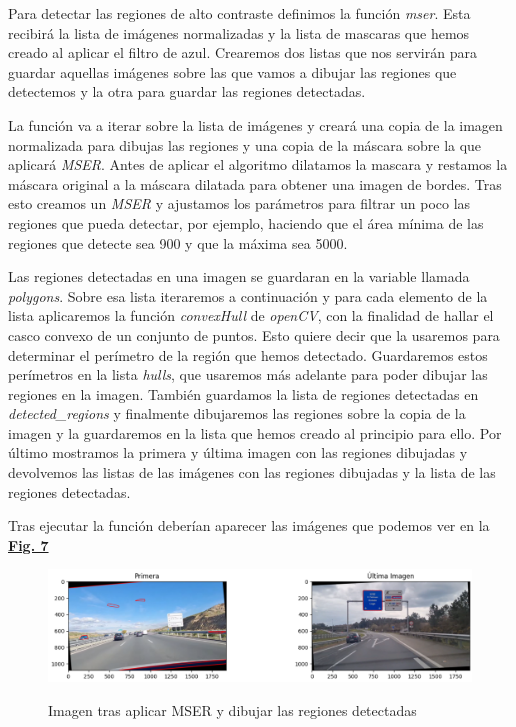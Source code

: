 \documentclass[a4paper, 12pt]{article}
\begin{document}
Para detectar las regiones de alto contraste definimos la función \textit{mser}. Esta recibirá la lista de imágenes normalizadas y la lista de mascaras que hemos creado al aplicar el filtro de azul. 
Crearemos dos listas que nos servirán para guardar aquellas imágenes sobre las que vamos a dibujar las regiones que detectemos y la otra para guardar las regiones detectadas. 


La función va a iterar sobre la lista de imágenes y creará una copia de la imagen normalizada para dibujas las regiones y una copia de la máscara sobre la que aplicará \textit{MSER}. Antes de aplicar el algoritmo dilatamos la mascara y restamos la máscara original a la máscara dilatada para obtener una imagen de bordes. Tras esto creamos un \textit{MSER} y ajustamos los parámetros para filtrar un poco las regiones que pueda detectar, por ejemplo, haciendo que el área mínima de las regiones que detecte sea 900 y que la máxima sea 5000. 


Las regiones detectadas en una imagen se guardaran en la variable llamada \textit{polygons}. Sobre esa lista iteraremos a continuación y para cada elemento de la lista aplicaremos la función \textit{convexHull} de \textit{openCV}, con la finalidad de hallar el casco convexo de un conjunto de puntos. Esto quiere decir que la usaremos para determinar el perímetro de la región que hemos detectado. Guardaremos estos perímetros en la lista \textit{hulls}, que usaremos más adelante para poder dibujar las regiones en la imagen. También guardamos la lista de regiones detectadas en \textit{detected\_regions} y finalmente dibujaremos las regiones sobre la copia de la imagen y la guardaremos en la lista que hemos creado al principio para ello. Por último mostramos la primera y última imagen con las regiones dibujadas y devolvemos las listas de las imágenes con las regiones dibujadas y la lista de las regiones detectadas.

Tras ejecutar la función deberían aparecer las imágenes que podemos ver en la \textbf{\hyperref[fig:imagenesMSER]{Fig. 7}}

\begin{figure}[h]
	\centering
	\caption{Imagen tras aplicar MSER y dibujar las regiones detectadas}\vspace{0.5cm}
	\includegraphics[width=0.6\linewidth]{img/ImagenesTrasMSER}
	\label{fig:imagenesMSER}
\end{figure}
\end{document}
